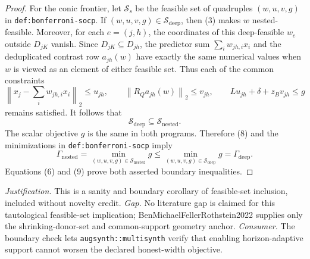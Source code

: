 \documentclass{article}
\begin{document}
\begin{proof}
For the conic frontier, let \(\mathcal S_s\) be the feasible set of quadruples \((w,u,v,g)\) in \texttt{def:bonferroni-socp}.  If \((w,u,v,g)\in\mathcal S_{\mathrm{deep}}\), then (3) makes \(w\) nested-feasible.  Moreover, for each \(e=(j,h)\), the coordinates of this deep-feasible \(w_e\) outside \(D_{jK}\) vanish.  Since \(D_{jK}\subseteq D_{jh}\), the predictor sum \(\sum_iw_{jh,i}x_i\) and the deduplicated contrast row \(a_{jh}(w)\) have exactly the same numerical values when \(w\) is viewed as an element of either feasible set.  Thus each of the common constraints
\[
 \left\|x_j-\sum_iw_{jh,i}x_i\right\|_2\leq u_{jh},
 \qquad
 \left\|R_Qa_{jh}(w)\right\|_2\leq v_{jh},
 \qquad
 Lu_{jh}+\delta+z_Bv_{jh}\leq g \tag{7}
\]
remains satisfied.  It follows that
\[
 \mathcal S_{\mathrm{deep}}\subseteq\mathcal S_{\mathrm{nested}}. \tag{8}
\]
The scalar objective \(g\) is the same in both programs.  Therefore (8) and the minimizations in \texttt{def:bonferroni-socp} imply
\[
 \Gamma_{\mathrm{nested}}
 =\min_{(w,u,v,g)\in\mathcal S_{\mathrm{nested}}}g
 \leq
 \min_{(w,u,v,g)\in\mathcal S_{\mathrm{deep}}}g
 =\Gamma_{\mathrm{deep}}. \tag{9}
\]
Equations (6) and (9) prove both asserted boundary inequalities.
\end{proof}
\par\smallskip\noindent \textit{Justification.} This is a sanity and boundary corollary of feasible-set inclusion, included without novelty credit. \textit{Gap.} No literature gap is claimed for this tautological feasible-set implication; BenMichaelFellerRothstein2022 supplies only the shrinking-donor-set and common-support geometry anchor. \textit{Consumer.} The boundary check lets \texttt{augsynth::multisynth} verify that enabling horizon-adaptive support cannot worsen the declared honest-width objective.
\end{document}
